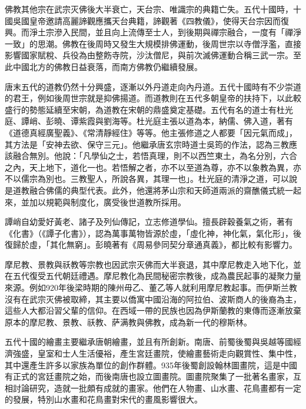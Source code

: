 佛教其他宗在武宗灭佛後大半衰亡，天台宗、唯識宗的典籍亡失。五代十國時，十國吳國皇帝邀請高麗諦觀應攜天台典籍，諦觀著《四教儀》，使得天台宗因而復興。而淨土宗滲入民間，並且向上流傳至士人，到後期與禪宗融合，一度有「禪淨一致」的思潮。佛教在後周時又發生大規模排佛運動，後周世宗以寺僧浮濫，直接影響國家賦稅、兵役為由整飭寺院，沙汰僧尼，與前次滅佛運動合稱三武一宗。至此中國北方的佛教日益衰落，而南方佛教仍繼續發展。

唐末五代的道教仍然十分興盛，逐漸以外丹道走向內丹道。五代十國時有不少崇道的君王，例如後周世宗就是抑佛揚道。而道教則在五代多朝皇帝的扶持下，以此較盛行的勢態延續至宋朝，為道教在宋朝的鼎盛奠定基礎。五代有名的道士有杜光庭、譚峭、彭曉、谭紫霞與劉海等。杜光庭主張以道為本，納儒、佛入道，著有《道德真經廣聖義》、《常清靜經住》等等。他主張修道之人都要「因元氣而成」，其方法是「安神去欲、保守三元」。他繼承唐玄宗時道士吳筠的作法，認為三教應該融合無別。他說：「凡學仙之士，若悟真理，則不以西竺東土，為名分別，六合之內，天上地下，道化一也。若悟解之者，亦不以至道為尊，亦不以象教為異，亦不以儒宗為別也。三教聖人，所說各異，其理一也」。杜光庭的清淨之道，可以說是道教融合佛儒的典型代表。此外，他還將茅山宗和天師道兩派的齋醮儀式統一起來，並加以規範與制度化，廣受後世道教所採用。

譚峭自幼愛好黃老、諸子及列仙傳記，立志修道學仙。擅長辟穀養氣之術，著有《化書》（《譚子化書》），認為萬事萬物皆源於虛，「虛化神，神化氣，氣化形」，後復歸於虛，「其化無窮」。彭曉著有《周易參同契分章通真義》，都比較有影響力。

摩尼教、景教與祅教等宗教也因武宗灭佛而大半衰退，其中摩尼教走入地下化，並在五代復受五代朝廷禮遇。摩尼教化為民間秘密宗教後，成為農民起事的凝聚力量來源。例如920年後梁時期的陳州毋乙、董乙等人就利用摩尼教起事。而伊斯兰教沒有在武宗灭佛被取締，其主要以僑寓中國沿海的阿拉伯、波斯商人的後裔為主，這些人大都沿習父輩的信仰。在西域一帶的民族也因為伊斯蘭教的東傳而逐漸放棄原本的摩尼教、景教、祅教、萨满教與佛教，成為新一代的穆斯林。

五代十國的繪畫主要繼承唐朝繪畫，並且有所創新。南唐、前蜀後蜀與吳越等國經濟強盛，皇室和士人生活優裕，產生宮廷畫院，使繪畫藝術走向觀賞性、集中性，其中還產生許多以家族為單位的創作群體。935年後蜀創設翰林圖畫院，這是中國有正式的宮廷畫院之始，而後南唐也設立圖畫院。圖畫院聚集了一批著名畫家，互相討論研究，造就一批頗有成就的畫家。他們在人物畫、山水畫、花鳥畫都有一定的發展，特別山水畫和花鳥畫對宋代的畫風影響很大。

